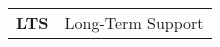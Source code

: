 
\renewcommand{\arraystretch}{1.5}



\begin{longtable}{l p{13.7cm}}
\textbf{LTS} & Long-Term Support \\

\end{longtable}
